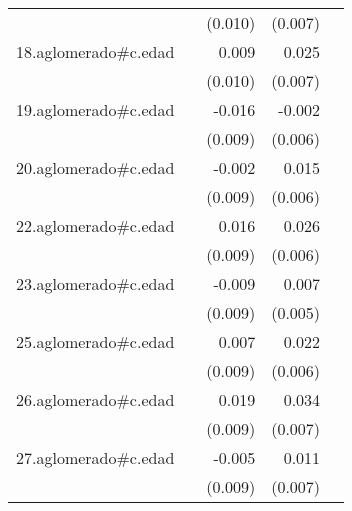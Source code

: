 {\begin{longtable}{l*{4}{D{.}{.}{-1}}}
            &                     &     (0.010)         &     (0.007)         &                     \\
\addlinespace
18.aglomerado#c.edad&                     &       0.009         &       0.025\sym{***}&                     \\
            &                     &     (0.010)         &     (0.007)         &                     \\
\addlinespace
19.aglomerado#c.edad&                     &      -0.016         &      -0.002         &                     \\
            &                     &     (0.009)         &     (0.006)         &                     \\
\addlinespace
20.aglomerado#c.edad&                     &      -0.002         &       0.015\sym{*}  &                     \\
            &                     &     (0.009)         &     (0.006)         &                     \\
\addlinespace
22.aglomerado#c.edad&                     &       0.016         &       0.026\sym{***}&                     \\
            &                     &     (0.009)         &     (0.006)         &                     \\
\addlinespace
23.aglomerado#c.edad&                     &      -0.009         &       0.007         &                     \\
            &                     &     (0.009)         &     (0.005)         &                     \\
\addlinespace
25.aglomerado#c.edad&                     &       0.007         &       0.022\sym{***}&                     \\
            &                     &     (0.009)         &     (0.006)         &                     \\
\addlinespace
26.aglomerado#c.edad&                     &       0.019\sym{*}  &       0.034\sym{***}&                     \\
            &                     &     (0.009)         &     (0.007)         &                     \\
\addlinespace
27.aglomerado#c.edad&                     &      -0.005         &       0.011         &                     \\
            &                     &     (0.009)         &     (0.007)         &                     \\

\end{longtable}}
